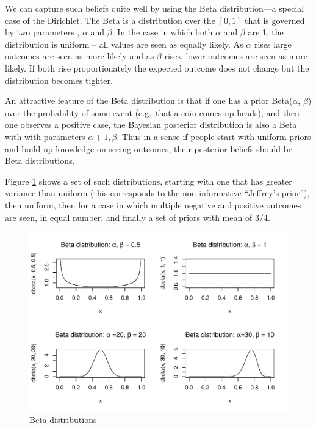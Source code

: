 \documentclass[
  12pt,
]{book}
\begin{document}
We can capture such beliefs quite well by using the Beta distribution---a special case of the Dirichlet. The Beta is a distribution over the \([0,1]\) that is governed by two parameters , \(\alpha\) and \(\beta\). In the case in which both \(\alpha\) and \(\beta\) are 1, the distribution is uniform -- all values are seen as equally likely. As \(\alpha\) rises large outcomes are seen as more likely and as \(\beta\) rises, lower outcomes are seen as more likely. If both rise proportionately the expected outcome does not change but the distribution becomes tighter.

An attractive feature of the Beta distribution is that if one has a prior Beta(\(\alpha\), \(\beta\)) over the probability of some event (e.g.~that a coin comes up heads), and then one observes a positive case, the Bayesian posterior distribution is also a Beta with with parameters \(\alpha+1, \beta\). Thus in a sense if people start with uniform priors and build up knowledge on seeing outcomes, their posterior beliefs should be Beta distributions.

Figure \ref{fig:Betas} shows a set of such distributions, starting with one that has greater variance than uniform (this corresponds to the non informative ``Jeffrey's prior''), then uniform, then for a case in which multiple negative and positive outcomes are seen, in equal number, and finally a set of priors with mean of 3/4.

\begin{figure}
\centering
\includegraphics{ii_files/figure-latex/Betas-1.pdf}
\caption{\label{fig:Betas}Beta distributions}
\end{figure}
\end{document}
